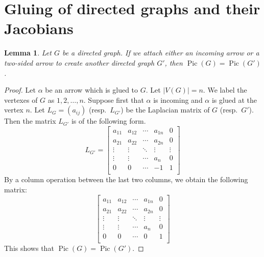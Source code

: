 \documentclass[11pt,reqno]{amsart}
\DeclareMathOperator{\Pic}{Pic}
\theoremstyle{definition}
\theoremstyle{plain}
\newtheorem{lem}[mydef]{\textbf{Lemma}}
\begin{document}
\section{Gluing of directed graphs and their Jacobians}

\begin{lem}\label{proposition: gluing an arrow proposition}
Let $G$ be a directed graph. If we attach either an incoming arrow or a two-sided arrow to create another directed graph $G'$, then $\Pic(G)=\Pic(G')$.
\end{lem}
\begin{proof}
Let $\alpha$ be an arrow which is glued to $G$. Let $|V(G)|=n$. We label the vertexes of $G$ as $1,2,\dots,n$. Suppose first that $\alpha$ is incoming and $\alpha$ is glued at the vertex $n$. Let $L_G=(a_{ij})$ (resp.~$L_{G'}$) be the Laplacian matrix of $G$ (resp.~$G'$). 
Then the matrix $L_{G'}$ is of the following form.
\begin{equation}
L_{G'}=\left[\begin{array}{ccc|c|c}
a_{11}&a_{12}&\cdots &a_{1n}&0\\
a_{21}&a_{22}&\cdots &a_{2n}&0\\
\vdots & \vdots &\ddots & \vdots & \vdots \\ \hline
\vdots & \vdots & \cdots&a_n & 0\\ \hline
0&0&\cdots &-1&1\\
\end{array}\right]
\end{equation}
		By a column operation between the last two columns, we obtain the following matrix:
		\begin{equation}\label{eq: arrow adding matrix}
			\left[\begin{array}{ccc|c|c}
				a_{11}&a_{12}&\cdots &a_{1n}&0\\
				a_{21}&a_{22}&\cdots &a_{2n}&0\\
				\vdots & \vdots &\ddots & \vdots & \vdots \\ \hline
				\vdots & \vdots & \cdots&a_n & 0\\ \hline
				0&0&\cdots &0&1\\
			\end{array}\right]
		\end{equation}
		This shows that $\Pic(G)=\Pic(G')$.


\end{proof}
\end{document}
